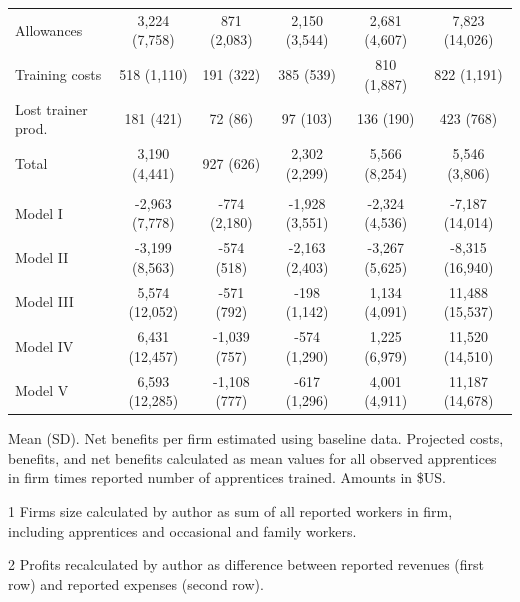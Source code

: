 \documentclass[
  11pt,
a4paper
]{article}
\begin{document}
\begin{table}[H]
{\begin{threeparttable}
\begin{tabular}[t]{lccccc}
\hspace{1em}Allowances & 3,224 (7,758) & 871 (2,083) & 2,150 (3,544) & 2,681 (4,607) & 7,823 (14,026)\\
\hspace{1em}Training costs & 518 (1,110) & 191 (322) & 385 (539) & 810 (1,887) & 822 (1,191)\\
\hspace{1em}Lost trainer prod. & 181 (421) & 72 (86) & 97 (103) & 136 (190) & 423 (768)\\
\hspace{1em}Total & 3,190 (4,441) & 927 (626) & 2,302 (2,299) & 5,566 (8,254) & 5,546 (3,806)\\
\addlinespace[0.3em]
\multicolumn{6}{l}{\textbf{Net benefits}}\\
\hspace{1em}Model I & -2,963 (7,778) & -774 (2,180) & -1,928 (3,551) & -2,324 (4,536) & -7,187 (14,014)\\
\hspace{1em}Model II & -3,199 (8,563) & -574 (518) & -2,163 (2,403) & -3,267 (5,625) & -8,315 (16,940)\\
\hspace{1em}Model III & 5,574 (12,052) & -571 (792) & -198 (1,142) & 1,134 (4,091) & 11,488 (15,537)\\
\hspace{1em}Model IV & 6,431 (12,457) & -1,039 (757) & -574 (1,290) & 1,225 (6,979) & 11,520 (14,510)\\
\hspace{1em}Model V & 6,593 (12,285) & -1,108 (777) & -617 (1,296) & 4,001 (4,911) & 11,187 (14,678)\\
\bottomrule
\end{tabular}
\begin{tablenotes}
\small
\item Mean (SD). Net benefits per firm estimated using baseline data. 
Projected costs, benefits, and net benefits calculated as mean values for all observed apprentices in 
firm times reported number of apprentices trained. Amounts in \$US.
\item[1] Firms size calculated by author as sum of all reported workers in firm, including apprentices and occasional and family workers.
\item[2] Profits recalculated by author as difference between reported revenues (first row) and reported expenses (second row).
\end{tablenotes}
\end{threeparttable}}
\end{table}
\end{document}

